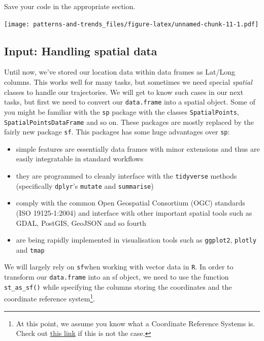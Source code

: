 \documentclass[]{book}
\providecommand{\tightlist}{%
  \setlength{\itemsep}{0pt}\setlength{\parskip}{0pt}}
\let\rmarkdownfootnote\footnote%
\def\footnote{\protect\rmarkdownfootnote}
\begin{document}
Save your code in the appropriate section.

\texttt{[image: patterns-and-trends\_files/figure-latex/unnamed-chunk-11-1.pdf]}

\hypertarget{input-handling-spatial-data}{%
\subsection{Input: Handling spatial data}\label{input-handling-spatial-data}}

Until now, we've stored our location data within data frames as Lat/Long columns. This works well for many tasks, but sometimes we need special \emph{spatial} classes to handle our trajectories. We will get to know such cases in our next tasks, but first we need to convert our \texttt{data.frame} into a spatial object.
Some of you might be familiar with the \texttt{sp} package with the classes \texttt{SpatialPoints}, \texttt{SpatialPointsDataFrame} and so on. These packages are mostly replaced by the fairly new package \texttt{sf}. This packages has some huge advantages over \texttt{sp}:

\begin{itemize}
\tightlist
\item
  simple features are essentially data frames with minor extensions and thus are easily integratable in standard workflows
\item
  they are programmed to cleanly interface with the \texttt{tidyverse} methods (specifically \texttt{dplyr}'s \texttt{mutate} and \texttt{summarise})
\item
  comply with the common Open Geospatial Consortium (OGC) standards (ISO 19125-1:2004) and interface with other important spatial tools such as GDAL, PostGIS, GeoJSON and so fourth
\item
  are being rapidly implemented in visualisation tools such as \texttt{ggplot2}, \texttt{plotly} and \texttt{tmap}
\end{itemize}

We will largely rely on \texttt{sf}when working with vector data in \texttt{R}. In order to transform our \texttt{data.frame} into an sf object, we need to use the function \texttt{st\_as\_sf()} while specifying the columns storing the coordinates and the coordinate reference system\footnote{At this point, we assume you know what a Coordinate Reference Systems is. Check out \href{https://earthdatascience.org/courses/earth-analytics/spatial-data-r/intro-to-coordinate-reference-systems/}{this link} if this is not the case.}.
\end{document}
